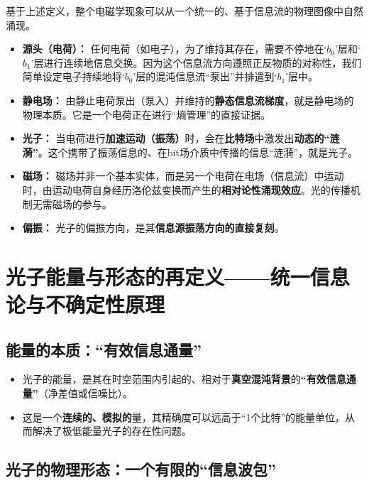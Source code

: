 \documentclass[12pt]{article}
\begin{document}
基于上述定义，整个电磁学现象可以从一个统一的、基于信息流的物理图像中自然涌现。

\begin{itemize}
    \item \textbf{源头（电荷）：} 任何电荷（如电子），为了维持其存在，需要不停地在`$b_0$'层和`$b_1$'层进行连续地信息交换。因为这个信息流方向遵照正反物质的对称性，我们简单设定电子持续地将`$b_0$'层的混沌信息流``泵出''并排遣到`$b_1$'层中。

    \item \textbf{静电场：} 由静止电荷泵出（泵入）并维持的\textbf{静态信息流梯度}，就是静电场的物理本质。它是一个电荷正在进行``熵管理''的直接证据。

    \item \textbf{光子：} 当电荷进行\textbf{加速运动（振荡）}时，会在\textbf{比特场}中激发出\textbf{动态的``涟漪''}。这个携带了振荡信息的、在bit场介质中传播的信息``涟漪''，就是光子。

    \item \textbf{磁场：} 磁场并非一个基本实体，而是另一个电荷在电场（信息流）中运动时，由运动电荷自身经历洛伦兹变换而产生的\textbf{相对论性涌现效应}。光的传播机制无需磁场的参与。

    \item \textbf{偏振：} 光子的偏振方向，是其\textbf{信息源振荡方向的直接复刻}。
\end{itemize}

\section{光子能量与形态的再定义——统一信息论与不确定性原理}

\subsection{能量的本质：``有效信息通量''}

\begin{itemize}
    \item 光子的能量，是其在时空范围内引起的、相对于\textbf{真空混沌背景}的\textbf{``有效信息通量''}（净差值或信噪比）。
    \item 这是一个\textbf{连续的、模拟的}量，其精确度可以远高于``1个比特''的能量单位，从而解决了极低能量光子的存在性问题。
\end{itemize}

\subsection{光子的物理形态：一个有限的``信息波包''}
\end{document}
